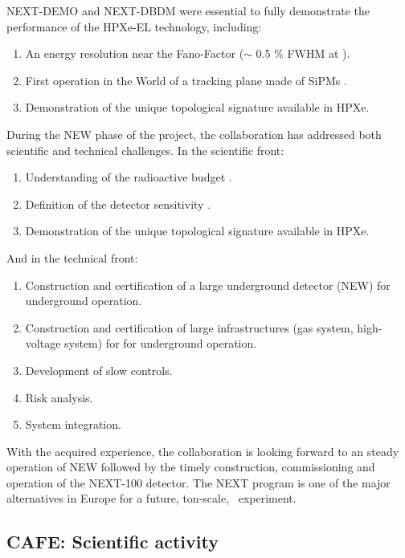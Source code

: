 \documentclass[a4paper,11pt,oneside]{article}
\begin{document}
 NEXT-DEMO and NEXT-DBDM were essential to fully demonstrate the performance of the HPXe-EL technology, including:
 \begin{enumerate}
\item An energy resolution near the Fano-Factor ($\sim$ 0.5 \% FWHM at \Qbb)\cite{Alvarez:2012yxw,Alvarez:2012zsz}.
\item First operation in the World of a tracking plane made of SiPMs \cite{Alvarez:2013gxa}.
\item Demonstration of the unique topological signature available in HPXe\cite{Ferrario:2015kta}.
\end{enumerate}

During the NEW phase of the project, the collaboration has addressed both scientific and technical challenges. In the scientific front:

\begin{enumerate}
\item Understanding of the radioactive budget \cite{Cebrian:2015jna, Alvarez:2014kvs, Dafni:2014yja}.
\item Definition of the detector sensitivity \cite{Martin-Albo:2015rhw}.
\item Demonstration of the unique topological signature available in HPXe\cite{Ferrario:2015kta}.
\end{enumerate}

And in the technical front:

\begin{enumerate}
\item Construction and certification of a large underground detector (NEW) for underground operation.
\item Construction and certification of large infrastructures (gas system, high-voltage system) for for underground operation.
\item Development of slow controls.
\item Risk analysis.
\item System integration.
\end{enumerate}

With the acquired experience, the collaboration is looking forward to an steady operation of NEW followed by the
timely construction, commissioning and operation of the NEXT-100 detector. The NEXT program is one of the major alternatives in Europe for a future, ton-scale, \bbonu\ experiment. 


\subsection*{CAFE: Scientific activity}
\end{document}
